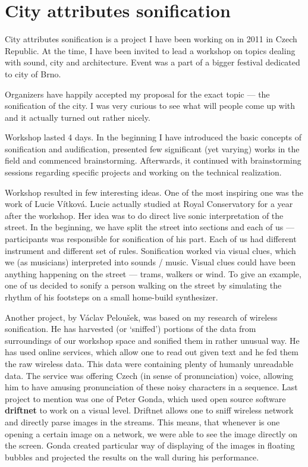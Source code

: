 \documentclass[12pt,a4paper,oneside]{report}
\begin{document}

\clearpage
\section{City attributes sonification}

City attributes sonification is a project I have been working on in 2011 in Czech Republic. At the time, I have been invited to lead a workshop on topics dealing with sound, city and architecture. Event was a part of a bigger festival dedicated to city of Brno.

Organizers have happily accepted my proposal for the exact topic --- the sonification of the city. I was very curious to see what will people come up with and it actually turned out rather nicely. 

Workshop lasted 4 days. In the beginning I have introduced the basic concepts of sonification and audification, presented few significant (yet varying) works in the field and commenced brainstorming. Afterwards, it continued with brainstorming sessions regarding specific projects and working on the technical realization.

Workshop resulted in few interesting ideas. One of the most inspiring one was the work of Lucie Vítková. Lucie actually studied at Royal Conservatory for a year after the workshop. Her idea was to do direct live sonic interpretation of the street. In the beginning, we have split the street into sections and each of us --- participants was responsible for sonification of his part. Each of us had different instrument and different set of rules. Sonification worked via visual clues, which we (as musicians) interpreted into sounds / music. Visual clues could have been anything happening on the street --- trams, walkers or wind. To give an example, one of us decided to sonify a person walking on the street by simulating the rhythm of his footsteps on a small home-build synthesizer.

Another project, by Václav Peloušek, was based on my research of wireless sonification. He has harvested (or `sniffed') portions of the data from surroundings of our workshop space and sonified them in rather unusual way. He has used online services, which allow one to read out given text and he fed them the raw wireless data. This data were containing plenty of humanly unreadable data. The service was offering Czech (in sense of pronunciation) voice, allowing him to have amusing pronunciation of these noisy characters in a sequence. Last project to mention was one of Peter Gonda, which used open source software \textbf{driftnet} to work on a visual level. Driftnet allows one to sniff wireless network and directly parse images in the streams. This means, that whenever is one opening a certain image on a network, we were able to see the image directly on the screen. Gonda created particular way of displaying of the images in floating bubbles and projected the results on the wall during his performance.
\end{document}
